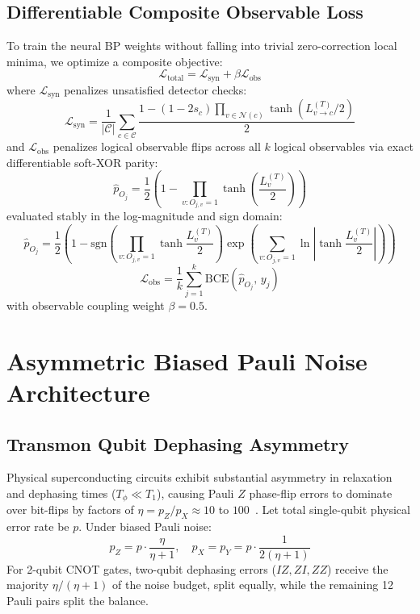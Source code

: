 \documentclass[journal]{IEEEtran}
\begin{document}
\subsection{Differentiable Composite Observable Loss}
To train the neural BP weights without falling into trivial zero-correction local minima, we optimize a composite objective:
\begin{equation}
    \mathcal{L}_{\text{total}} = \mathcal{L}_{\text{syn}} + \beta \mathcal{L}_{\text{obs}}
\end{equation}
where $\mathcal{L}_{\text{syn}}$ penalizes unsatisfied detector checks:
\begin{equation}
    \mathcal{L}_{\text{syn}} = \frac{1}{|\mathcal{C}|} \sum_{c \in \mathcal{C}} \frac{1 - (1 - 2 s_c) \prod_{v \in \mathcal{N}(c)} \tanh(L_{v \to c}^{(T)} / 2)}{2}
\end{equation}
and $\mathcal{L}_{\text{obs}}$ penalizes logical observable flips across all $k$ logical observables via exact differentiable soft-XOR parity:
\begin{equation}
    \hat{p}_{O_j} = \frac{1}{2}\left(1 - \prod_{v : O_{j,v} = 1} \tanh\left(\frac{L_v^{(T)}}{2}\right)\right)
\end{equation}
evaluated stably in the log-magnitude and sign domain:
\begin{equation}
    \hat{p}_{O_j} = \frac{1}{2}\left(1 - \text{sgn}\left(\prod_{v : O_{j,v} = 1} \tanh\frac{L_v^{(T)}}{2}\right) \exp\left(\sum_{v : O_{j,v} = 1} \ln\left|\tanh\frac{L_v^{(T)}}{2}\right|\right)\right)
\end{equation}
\begin{equation}
    \mathcal{L}_{\text{obs}} = \frac{1}{k} \sum_{j=1}^k \text{BCE}\left(\hat{p}_{O_j}, \, y_j\right)
\end{equation}
with observable coupling weight $\beta = 0.5$.

\section{Asymmetric Biased Pauli Noise Architecture}

\subsection{Transmon Qubit Dephasing Asymmetry}
Physical superconducting circuits exhibit substantial asymmetry in relaxation and dephasing times ($T_\phi \ll T_1$), causing Pauli $Z$ phase-flip errors to dominate over bit-flips by factors of $\eta = p_Z / p_X \approx 10$ to $100$~\cite{tuckett2018ultrahigh,aliferis2009fault}.
Let total single-qubit physical error rate be $p$. Under biased Pauli noise:
\begin{equation}
    p_Z = p \cdot \frac{\eta}{\eta + 1}, \quad p_X = p_Y = p \cdot \frac{1}{2(\eta + 1)}
\end{equation}
For 2-qubit CNOT gates, two-qubit dephasing errors ($IZ, ZI, ZZ$) receive the majority $\eta/(\eta+1)$ of the noise budget, split equally, while the remaining 12 Pauli pairs split the balance.
\end{document}
